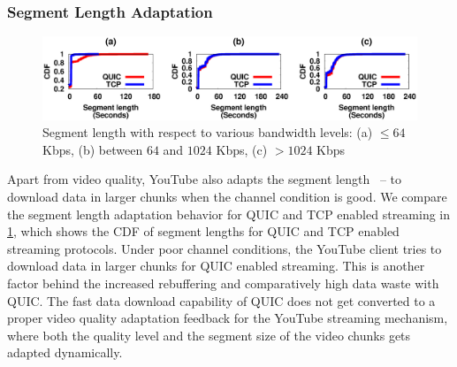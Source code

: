 \subsubsection{Segment Length Adaptation}

\begin{figure}[!t]
	\captionsetup[subfigure]{}
	\begin{center}
        \includegraphics[width=\linewidth]{img/plotdata/CDF/Segment/plot_segment_bucket123}
		\caption{\label{fig:segment}Segment length with respect to various bandwidth levels: (a) $\leq 64$ Kbps, (b)  between $64$ and $1024$ Kbps, (c) $> 1024$ Kbps}
	\end{center}
\end{figure}


Apart from video quality, YouTube also adapts the segment length~\cite{mondal2017youtube} -- to download data in larger chunks when the channel condition is good. We compare the segment length adaptation behavior for \ac{QUIC} and \ac{TCP} enabled streaming in \fig\ref{fig:segment}, which shows the \ac{CDF} of segment lengths for \ac{QUIC} and \ac{TCP} enabled streaming protocols. 
Under poor channel conditions, the YouTube client tries to download data in larger chunks for \ac{QUIC} enabled streaming. This is another factor behind the increased rebuffering and comparatively high data waste with \ac{QUIC}. The fast data download capability of \ac{QUIC} does not get converted to a proper video quality adaptation feedback for the YouTube streaming mechanism, where both the quality level and the segment size of the video chunks gets adapted dynamically. 

